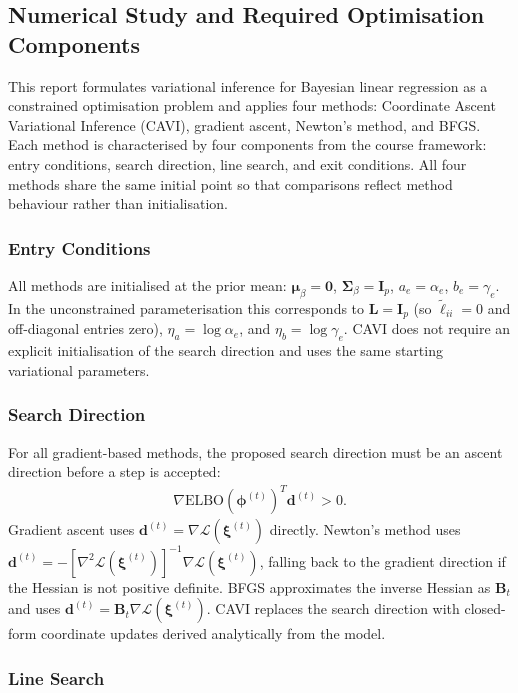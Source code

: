 \documentclass[11pt,a4paper]{article}
\newcommand{\ELBO}{\text{ELBO}}
\begin{document}
 
\subsection{Numerical Study and Required Optimisation Components}

This report formulates variational inference for Bayesian linear regression as a constrained optimisation problem and applies four methods: Coordinate Ascent Variational Inference (CAVI), gradient ascent, Newton's method, and BFGS. Each method is characterised by four components from the course framework: entry conditions, search direction, line search, and exit conditions. All four methods share the same initial point so that comparisons reflect method behaviour rather than initialisation.

\subsubsection*{Entry Conditions}

All methods are initialised at the prior mean: $\bm{\mu}_\beta = \bm{0}$, $\bm{\Sigma}_\beta = \bm{I}_p$, $a_e = \alpha_e$, $b_e = \gamma_e$. In the unconstrained parameterisation this corresponds to $\bm{L} = \bm{I}_p$ (so $\tilde{\ell}_{ii} = 0$ and off-diagonal entries zero), $\eta_a = \log \alpha_e$, and $\eta_b = \log \gamma_e$. CAVI does not require an explicit initialisation of the search direction and uses the same starting variational parameters.

\subsubsection*{Search Direction}

For all gradient-based methods, the proposed search direction must be an ascent direction before a step is accepted:
\begin{align}
\nabla \ELBO(\bm{\phi}^{(t)})^T \bm{d}^{(t)} > 0.
\end{align}
Gradient ascent uses $\bm{d}^{(t)} = \nabla\mathcal{L}(\bm{\xi}^{(t)})$ directly. Newton's method uses $\bm{d}^{(t)} = -[\nabla^2\mathcal{L}(\bm{\xi}^{(t)})]^{-1}\nabla\mathcal{L}(\bm{\xi}^{(t)})$, falling back to the gradient direction if the Hessian is not positive definite. BFGS approximates the inverse Hessian as $\bm{B}_t$ and uses $\bm{d}^{(t)} = \bm{B}_t \nabla\mathcal{L}(\bm{\xi}^{(t)})$. CAVI replaces the search direction with closed-form coordinate updates derived analytically from the model.

\subsubsection*{Line Search}
\end{document}
